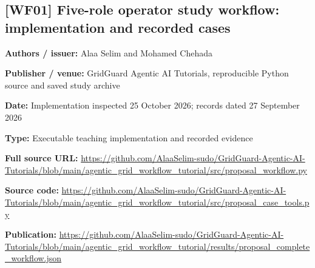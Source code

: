\documentclass[10pt,letterpaper]{article}
\begin{document}
\subsection*{[WF01] Five-role operator study workflow: implementation and recorded cases}
\textbf{Authors / issuer:} Alaa Selim and Mohamed Chehada\par
\textbf{Publisher / venue:} GridGuard Agentic AI Tutorials, reproducible Python source and saved study archive\par
\textbf{Date:} Implementation inspected 25 October 2026; records dated 27 September 2026\par
\textbf{Type:} Executable teaching implementation and recorded evidence\par
\textbf{Full source URL:} \href{https://github.com/AlaaSelim-sudo/GridGuard-Agentic-AI-Tutorials/blob/main/agentic_grid_workflow_tutorial/src/proposal_workflow.py}{\small\ttfamily https:/\allowbreak{}/\allowbreak{}github.\allowbreak{}com/\allowbreak{}AlaaSelim-\allowbreak{}sudo/\allowbreak{}GridGuard-\allowbreak{}Agentic-\allowbreak{}AI-\allowbreak{}Tutorials/\allowbreak{}blob/\allowbreak{}main/\allowbreak{}agentic\_\allowbreak{}grid\_\allowbreak{}workflow\_\allowbreak{}tutorial/\allowbreak{}src/\allowbreak{}proposal\_\allowbreak{}workflow.\allowbreak{}py}\par
\textbf{Source code:} \href{https://github.com/AlaaSelim-sudo/GridGuard-Agentic-AI-Tutorials/blob/main/agentic_grid_workflow_tutorial/src/proposal_case_tools.py}{\small\ttfamily https:/\allowbreak{}/\allowbreak{}github.\allowbreak{}com/\allowbreak{}AlaaSelim-\allowbreak{}sudo/\allowbreak{}GridGuard-\allowbreak{}Agentic-\allowbreak{}AI-\allowbreak{}Tutorials/\allowbreak{}blob/\allowbreak{}main/\allowbreak{}agentic\_\allowbreak{}grid\_\allowbreak{}workflow\_\allowbreak{}tutorial/\allowbreak{}src/\allowbreak{}proposal\_\allowbreak{}case\_\allowbreak{}tools.\allowbreak{}py}\par
\textbf{Publication:} \href{https://github.com/AlaaSelim-sudo/GridGuard-Agentic-AI-Tutorials/blob/main/agentic_grid_workflow_tutorial/results/proposal_complete_workflow.json}{\small\ttfamily https:/\allowbreak{}/\allowbreak{}github.\allowbreak{}com/\allowbreak{}AlaaSelim-\allowbreak{}sudo/\allowbreak{}GridGuard-\allowbreak{}Agentic-\allowbreak{}AI-\allowbreak{}Tutorials/\allowbreak{}blob/\allowbreak{}main/\allowbreak{}agentic\_\allowbreak{}grid\_\allowbreak{}workflow\_\allowbreak{}tutorial/\allowbreak{}results/\allowbreak{}proposal\_\allowbreak{}complete\_\allowbreak{}workflow.\allowbreak{}json}\par
\par\medskip
\end{document}
